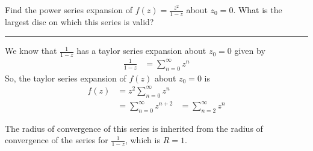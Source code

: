 \begin{example}
    Find the power series expansion of $f(z) = \frac{z^2}{1-z}$ about $z_0 = 0$. What is the largest disc on which this series is valid?

    \hrule
    \vspace{0.5cm}

    We know that $\frac{1}{1-z}$ has a taylor series expansion about $z_0 = 0$ given by
    \begin{align*}
        \frac{1}{1-z} & = \sum_{n=0}^{\infty} z^n
    \end{align*}
    So, the taylor series expansion of $f(z)$ about $z_0 = 0$ is
    \begin{align*}
        f(z) & = z^2 \sum_{n=0}^{\infty} z^n \\
             & = \sum_{n=0}^{\infty} z^{n+2}
             & = \sum_{n=2}^{\infty} z^n
    \end{align*}

    The radius of convergence of this series is inherited from the radius of convergence of the series for $\frac{1}{1-z}$, which is $R = 1$.
\end{example}


